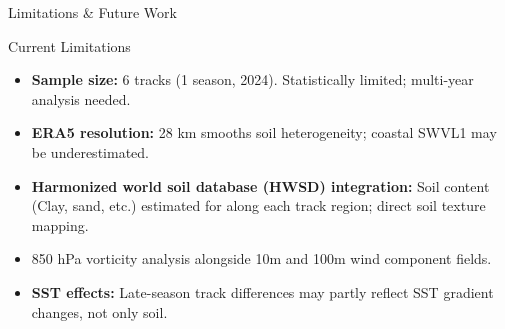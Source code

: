 \documentclass[10pt, aspectratio=169,t,xcolor=table]{beamer}
\begin{document}
%
\begin{frame}{Limitations \& Future Work}
	\vspace{-0.5cm}
	\begin{block}{\small Current Limitations}
		\begin{itemize}\footnotesize
			\item \textbf{Sample size:} 6 tracks (1 season, 2024). Statistically limited; multi-year analysis needed.
			\item \textbf{ERA5 resolution:} 28 km smooths soil heterogeneity; coastal SWVL1 may be underestimated.
			\item \textbf{Harmonized world soil database (HWSD) integration:} Soil content (Clay, sand, etc.) estimated for along each track region; direct soil texture mapping.
			\item 850 hPa vorticity analysis alongside 10m and 100m wind component fields.
			\item \textbf{SST effects:} Late-season track differences may partly reflect SST gradient changes, not only soil.
		\end{itemize}
	\end{block}
	\vfill
\end{frame}

\end{document}

